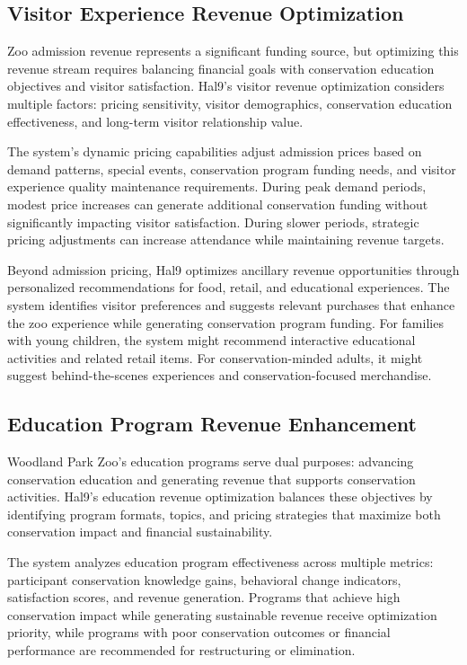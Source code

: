 \documentclass[
  Letterpaper,
]{scrbook}
\begin{document}
\subsection{Visitor Experience Revenue
Optimization}\label{visitor-experience-revenue-optimization}

Zoo admission revenue represents a significant funding source, but
optimizing this revenue stream requires balancing financial goals with
conservation education objectives and visitor satisfaction. Hal9's
visitor revenue optimization considers multiple factors: pricing
sensitivity, visitor demographics, conservation education effectiveness,
and long-term visitor relationship value.

The system's dynamic pricing capabilities adjust admission prices based
on demand patterns, special events, conservation program funding needs,
and visitor experience quality maintenance requirements. During peak
demand periods, modest price increases can generate additional
conservation funding without significantly impacting visitor
satisfaction. During slower periods, strategic pricing adjustments can
increase attendance while maintaining revenue targets.

Beyond admission pricing, Hal9 optimizes ancillary revenue opportunities
through personalized recommendations for food, retail, and educational
experiences. The system identifies visitor preferences and suggests
relevant purchases that enhance the zoo experience while generating
conservation program funding. For families with young children, the
system might recommend interactive educational activities and related
retail items. For conservation-minded adults, it might suggest
behind-the-scenes experiences and conservation-focused merchandise.

\subsection{Education Program Revenue
Enhancement}\label{education-program-revenue-enhancement}

Woodland Park Zoo's education programs serve dual purposes: advancing
conservation education and generating revenue that supports conservation
activities. Hal9's education revenue optimization balances these
objectives by identifying program formats, topics, and pricing
strategies that maximize both conservation impact and financial
sustainability.

The system analyzes education program effectiveness across multiple
metrics: participant conservation knowledge gains, behavioral change
indicators, satisfaction scores, and revenue generation. Programs that
achieve high conservation impact while generating sustainable revenue
receive optimization priority, while programs with poor conservation
outcomes or financial performance are recommended for restructuring or
elimination.
\end{document}
